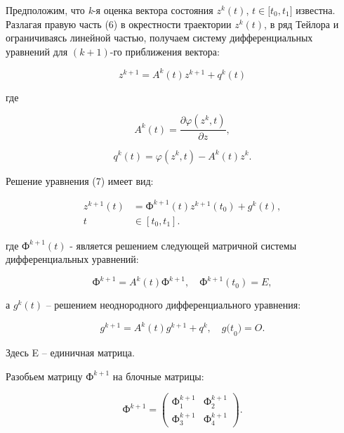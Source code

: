 \begin{multicols}{2}
Предположим, что \emph{k}-я оценка вектора состояния
\(z^{k}(t)\),
\(t \in \lbrack t_{0},t_{1}\rbrack\) известна. Разлагая правую часть (6)
в окрестности траектории \(z^{k}(t)\), в ряд
Тейлора и ограничиваясь линейной частью, получаем систему
дифференциальных уравнений для \((k + 1)\)-го приближения вектора:

\begin{equation}
{z}^{k + 1} = A^{k}(t)z^{k + 1} + q^{k}(t)
\end{equation}

где

\begin{equation*}
A^{k}(t) = \frac{\partial\varphi(z^{k},t)}{\partial z},
\end{equation*}

\begin{equation*}
q^{k}(t) = \varphi\left( z^{k},t \right) - A^{k}(t)z^{k}.
\end{equation*}

Решение уравнения (7) имеет вид:

\begin{equation}
\begin{aligned}
z^{k + 1}(t) &= \text{Ф}^{k + 1}(t)z^{k + 1}\left( t_{0} \right) + g^{k}(t), \\
t &\in \left\lbrack t_{0}, t_{1} \right\rbrack.
\end{aligned}
\end{equation}

где \(Ф^{k + 1}(t)\) - является решением
следующей матричной системы дифференциальных уравнений:

\begin{equation}
{\text{Ф}}^{k + 1} = A^{k}(t)\text{Ф}^{k + 1},\quad \text{Ф}^{k + 1}\left( t_{0} \right) = E,
\end{equation}

а \(g^{k}(t)\) -- решением неоднородного
дифференциального уравнения:

\begin{equation}
{g}^{k + 1} = A^{k}(t)g^{k + 1} + q^{k},\quad {g(t}_{0}) = O.
\end{equation}

Здесь E -- единичная матрица.

Разобьем матрицу \(\text{Ф}^{k + 1}\) на блочные
матрицы:

\[\text{Ф}^{k + 1} = \begin{pmatrix}
\text{Ф}_{1}^{k + 1} & \text{Ф}_{2}^{k + 1} \\
\text{Ф}_{3}^{k + 1} & \text{Ф}_{4}^{k + 1}
\end{pmatrix}.\]


\end{multicols}
